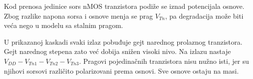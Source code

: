 Kod prenosa jedinice sors nMOS tranzistora podiže se iznad potencijala osnove. Zbog razlike napona sorsa i osnove menja se prag $V_{Tn}$, pa degradacija može biti veća nego u modelu sa stalnim pragom.

U prikazanoj kaskadi svaki izlaz pobuđuje gejt narednog prolaznog tranzistora. Gejt narednog stepena zato već dobija snižen visoki nivo. Na izlazu nastaje $V_{DD}-V_{Tn1}-V_{Tn2}-V_{Tn3}$. Pragovi pojedinačnih tranzistora nisu nužno isti, jer su njihovi sorsovi različito polarizovani prema osnovi. Sve osnove ostaju na masi.
